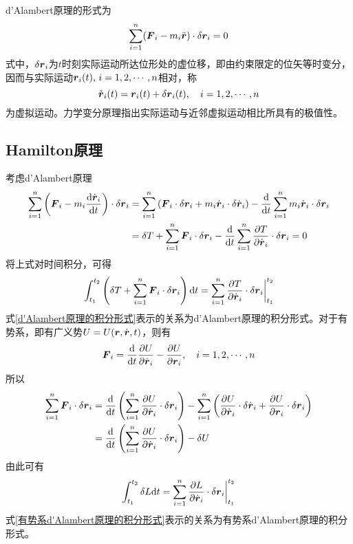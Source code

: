 d'Alambert原理的形式为
\begin{equation*}
	\sum_{i=1}^n(\boldsymbol{F}_i - m_i \ddot{\boldsymbol{r}}) \cdot \delta \boldsymbol{r}_i = 0
\end{equation*}
式中，$\delta \boldsymbol{r}_i$为$t$时刻实际运动所达位形处的虚位移，即由约束限定的位矢等时变分，因而与实际运动$\boldsymbol{r}_i(t),\,i=1,2,\cdots,n$相对，称
\begin{equation*}
	\tilde{\boldsymbol{r}}_i(t) = \boldsymbol{r}_i(t) + \delta \boldsymbol{r}_i(t),\quad i=1,2,\cdots,n
\end{equation*}
为虚拟运动。力学变分原理指出实际运动与近邻虚拟运动相比所具有的极值性。

\subsection{Hamilton原理}

考虑d'Alambert原理
\begin{align*}
	\sum_{i=1}^n \left(\boldsymbol{F}_i - m_i \frac{\mathrm{d} \dot{\boldsymbol{r}}_i}{\mathrm{d} t}\right) \cdot \delta \boldsymbol{r}_i & = \sum_{i=1}^n \left(\boldsymbol{F}_i \cdot \delta \boldsymbol{r}_i + m_i \dot{\boldsymbol{r}}_i \cdot \delta \dot{\boldsymbol{r}}_i\right) - \frac{\mathrm{d}}{\mathrm{d} t} \sum_{i=1}^n m_i \dot{\boldsymbol{r}}_i \cdot \delta \boldsymbol{r}_i \\
	& = \delta T + \sum_{i=1}^n \boldsymbol{F}_i \cdot \delta \boldsymbol{r}_i - \frac{\mathrm{d}}{\mathrm{d} t} \sum_{i=1}^n \frac{\partial T}{\partial \dot{\boldsymbol{r}}_i} \cdot \delta \boldsymbol{r}_i = 0
\end{align*}
将上式对时间积分，可得
\begin{equation}
	\int_{t_1}^{t_2} \left(\delta T + \sum_{i=1}^n \boldsymbol{F}_i \cdot \delta \boldsymbol{r}_i\right) \mathrm{d} t = \sum_{i=1}^n \frac{\partial T}{\partial \dot{\boldsymbol{r}}_i} \cdot \delta \boldsymbol{r}_i \bigg|_{t_1}^{t_2}
	\label{d'Alambert原理的积分形式}
\end{equation}
式\eqref{d'Alambert原理的积分形式}表示的关系为{\heiti d'Alambert原理的积分形式}。对于有势系，即有广义势$U = U(\boldsymbol{r},\dot{\boldsymbol{r}},t)$，则有
\begin{equation*}
	\boldsymbol{F}_i = \frac{\mathrm{d}}{\mathrm{d} t} \frac{\partial U}{\partial \dot{\boldsymbol{r}}_i} - \frac{\partial U}{\partial \boldsymbol{r}_i},\quad i=1,2,\cdots,n
\end{equation*}
所以
\begin{align*}
	\sum_{i=1}^n \boldsymbol{F}_i \cdot \delta \boldsymbol{r}_i & = \frac{\mathrm{d}}{\mathrm{d} t} \left(\sum_{i=1}^n \frac{\partial U}{\partial \dot{\boldsymbol{r}}_i} \cdot \delta \boldsymbol{r}_i\right) - \sum_{i=1}^n \left(\frac{\partial U}{\partial \dot{\boldsymbol{r}}_i} \cdot \delta \dot{\boldsymbol{r}}_i + \frac{\partial U}{\partial \boldsymbol{r}_i} \cdot \delta \boldsymbol{r}_i \right) \\
	& = \frac{\mathrm{d}}{\mathrm{d} t} \left(\sum_{i=1}^n \frac{\partial U}{\partial \dot{\boldsymbol{r}}_i} \cdot \delta \boldsymbol{r}_i\right) - \delta U
\end{align*}
由此可有
\begin{equation}
	\int_{t_1}^{t_2} \delta L \mathrm{d} t = \sum_{i=1}^n \frac{\partial L}{\partial \dot{\boldsymbol{r}}_i} \cdot \delta \boldsymbol{r}_i \bigg|_{t_1}^{t_2}
	\label{有势系d'Alambert原理的积分形式}
\end{equation}
式\eqref{有势系d'Alambert原理的积分形式}表示的关系为{\heiti 有势系d'Alambert原理的积分形式}。

